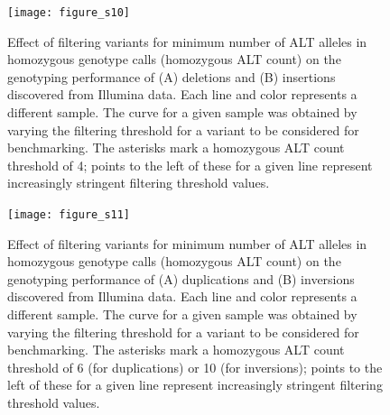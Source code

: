 \documentclass[12pt]{article}
\newenvironment{cfigure}
	{\begin{figure} \centering}
	{\end{figure}}
\begin{document}
\clearpage%

\begin{cfigure}
	\texttt{[image: figure\_s10]}

	\caption[Effect of homozygous ALT count on genotyping performance of Illumina deletions and insertions]{
		Effect of filtering variants for minimum number of ALT alleles in homozygous genotype calls (homozygous ALT count) on the genotyping performance of (A) deletions and (B) insertions discovered from Illumina data.
		Each line and color represents a different sample.
		The curve for a given sample was obtained by varying the filtering threshold for a variant to be considered for benchmarking.
		The asterisks mark a homozygous ALT count threshold of 4; points to the left of these for a given line represent increasingly stringent filtering threshold values.
	}

	\label{fig_s10}

\end{cfigure}

\clearpage%

\begin{cfigure}
	\texttt{[image: figure\_s11]}

	\caption[Effect of homozygous ALT count on genotyping performance of Illumina duplications and inversions]{
		Effect of filtering variants for minimum number of ALT alleles in homozygous genotype calls (homozygous ALT count) on the genotyping performance of (A) duplications and (B) inversions discovered from Illumina data.
		Each line and color represents a different sample.
		The curve for a given sample was obtained by varying the filtering threshold for a variant to be considered for benchmarking.
		The asterisks mark a homozygous ALT count threshold of 6 (for duplications) or 10 (for inversions); points to the left of these for a given line represent increasingly stringent filtering threshold values.
	}

	\label{fig_s11}

\end{cfigure}

\clearpage%
\end{document}
